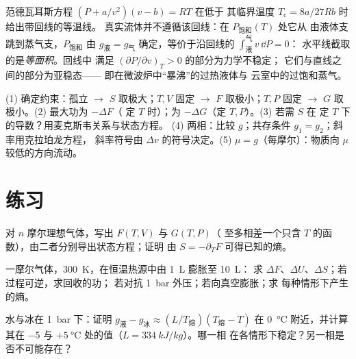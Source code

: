 \begin{remark}[范德瓦耳斯方程与麦克斯韦作图法]\label{rem:b2:thermodynamic-potentials:maxwellconstruction}
范德瓦耳斯方程 $(P + a/v^2)(v - b) = RT$ 在低于
其临界温度 $T_{\text{c}} = 8a/27Rb$ 时给出带回线的等温线。
真实流体并不遵循该回线：在 $P_{\text{饱和}}(T)$ 处它从
由液体支跳到蒸气支，$P_{\text{饱和}}$ 由 $g_{\text{液}}
= g_{\text{气}}$ 确定，等价于沿回线的 $\int_{\text{液}}^{\text{气}}v\,\dd P = 0$：
水平线截取的是\emph{等面积}。回线中
满足 $(\partial P/\partial v)_T > 0$ 的部分为力学不稳定；
它们与直线之间的部分为亚稳态——
即在微波炉中“暴沸”的过热液体与
云室中的过饱和蒸气。
\end{remark}

\begin{method}[使用热力学势]\label{meth:b2:thermodynamic-potentials:method}
(1) 确定约束：孤立 $\to$ $S$ 取极大；$T,V$ 固定 $\to$
$F$ 取极小；$T,P$ 固定 $\to$ $G$ 取极小。(2) 最大功为 $-\Delta F$（
定 $T$ 时）；为 $-\Delta G$（定 $T,P$）。(3) 若需 $S$ 在
定 $T$ 下的导数？用麦克斯韦关系与状态方程。
(4) 两相：比较 $g$；共存条件 $g_1 = g_2$；斜率用克拉珀龙方程，
斜率符号由 $\Delta v$ 的符号决定。(5)  $\mu = g$（每摩尔）：物质向 $\mu$ 较低的方向流动。
\end{method}

\section{练习}

\begin{exercise}[$\star$]\label{exo:b2:thermodynamic-potentials:1}
对 $n$ 摩尔理想气体，写出 $F(T,V)$ 与 $G(T,P)$（
至多相差一个只含 $T$ 的函数），由二者分别导出状态方程；证明
由 $S = -\partial_TF$ 可得已知的熵。
\end{exercise}

\begin{exercise}[$\star$]\label{exo:b2:thermodynamic-potentials:2}
一摩尔气体，\qty{300}{K}，在恒温热源中由 \qty{1}{L} 膨胀至 \qty{10}{L}：
求 $\Delta F$、$\Delta U$、$\Delta S$；若过程可逆，求回收的功；
若对抗 \qty{1}{bar} 外压；若向真空膨胀；求
每种情形下产生的熵。
\end{exercise}

\begin{exercise}[$\star$]\label{exo:b2:thermodynamic-potentials:3}
水与冰在 \qty{1}{bar} 下：证明 $g_{\text{液}} - g_{\text{冰}} \approx
(L/T_{\text{熔}})(T_{\text{熔}} - T)$ 在 \qty{0}{\celsius} 附近，并计算
其在 \qty{-5}{} 与 $+\qty{5}{\celsius}$ 处的值（$L = \qty{334}{kJ/kg}$）。哪一相
在各情形下稳定？另一相是否不可能存在？
\end{exercise}

